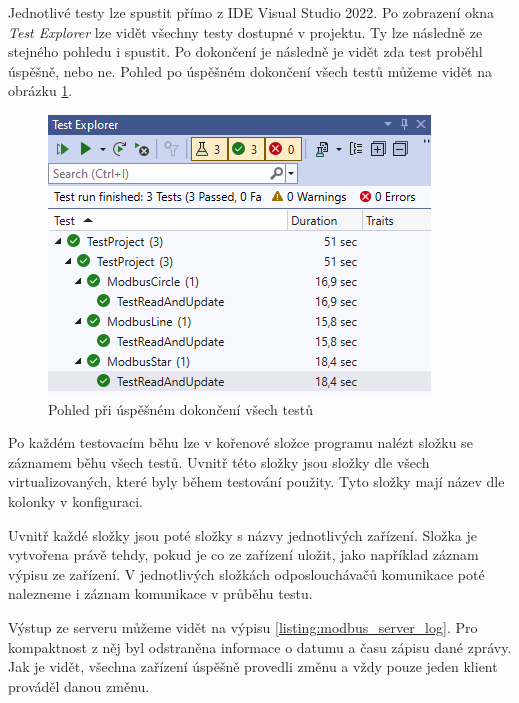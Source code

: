 Jednotlivé testy lze spustit přímo z IDE Visual Studio 2022\cite{vs2022}. Po zobrazení okna \textit{Test Explorer} lze vidět všechny testy dostupné v projektu. Ty lze následně ze stejného pohledu i spustit. Po dokončení je následně je vidět zda test proběhl úspěšně, nebo ne. Pohled po úspěšném dokončení všech testů můžeme vidět na obrázku \ref{fig:modbus_test_success}. 

\begin{figure}[htbp]
    \centering 
    \includegraphics{assets/img/modbus_test.png}
    \caption{Pohled při úspěšném dokončení všech testů}
    \label{fig:modbus_test_success}
\end{figure}

Po každém testovacím běhu lze v kořenové složce programu nalézt složku se záznamem běhu všech testů. Uvnitř této složky jsou složky dle všech virtualizovaných, které byly během testování použity. Tyto složky mají název dle kolonky  v konfiguraci. 

Uvnitř každé složky jsou poté složky s názvy jednotlivých zařízení. Složka je vytvořena právě tehdy, pokud je co ze zařízení uložit, jako například záznam výpisu ze zařízení. V jednotlivých složkách odposlouchávačů komunikace poté nalezneme i záznam komunikace v průběhu testu. 

Výstup ze serveru můžeme vidět na výpisu \ref{listing:modbus_server_log}. Pro kompaktnost z něj byl odstraněna informace o datumu a času zápisu dané zprávy. Jak je vidět, všechna zařízení úspěšně provedli změnu a vždy pouze jeden klient prováděl danou změnu.

